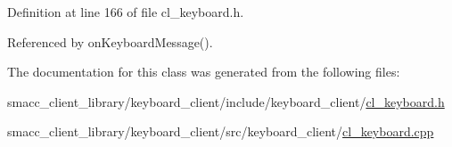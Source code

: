 Definition at line 166 of file cl\+\_\+keyboard.\+h.



Referenced by on\+Keyboard\+Message().



The documentation for this class was generated from the following files\+:\begin{DoxyCompactItemize}
\item 
smacc\+\_\+client\+\_\+library/keyboard\+\_\+client/include/keyboard\+\_\+client/\hyperlink{cl__keyboard_8h}{cl\+\_\+keyboard.\+h}\item 
smacc\+\_\+client\+\_\+library/keyboard\+\_\+client/src/keyboard\+\_\+client/\hyperlink{cl__keyboard_8cpp}{cl\+\_\+keyboard.\+cpp}\end{DoxyCompactItemize}
